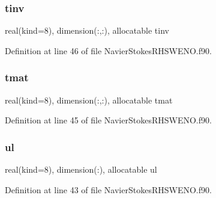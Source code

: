 \subsubsection{\texorpdfstring{tinv}{tinv}}
{\footnotesize\ttfamily real(kind=8), dimension(\+:,\+:), allocatable tinv}



Definition at line 46 of file Navier\+Stokes\+R\+H\+S\+W\+E\+N\+O.\+f90.

\hypertarget{structnavierstokesrhsweno_1_1dissipation__local_ab4126ba86ef24d63664fd42eb6e8c12c}{}\label{structnavierstokesrhsweno_1_1dissipation__local_ab4126ba86ef24d63664fd42eb6e8c12c} 
\subsubsection{\texorpdfstring{tmat}{tmat}}
{\footnotesize\ttfamily real(kind=8), dimension(\+:,\+:), allocatable tmat}



Definition at line 45 of file Navier\+Stokes\+R\+H\+S\+W\+E\+N\+O.\+f90.

\hypertarget{structnavierstokesrhsweno_1_1dissipation__local_a5c06967f28c037eba665af6d7fa98c25}{}\label{structnavierstokesrhsweno_1_1dissipation__local_a5c06967f28c037eba665af6d7fa98c25} 
\subsubsection{\texorpdfstring{ul}{ul}}
{\footnotesize\ttfamily real(kind=8), dimension(\+:), allocatable ul}



Definition at line 43 of file Navier\+Stokes\+R\+H\+S\+W\+E\+N\+O.\+f90.

\hypertarget{structnavierstokesrhsweno_1_1dissipation__local_ac96095150a233114bab88fc0c1f4adc9}{}\label{structnavierstokesrhsweno_1_1dissipation__local_ac96095150a233114bab88fc0c1f4adc9} 
